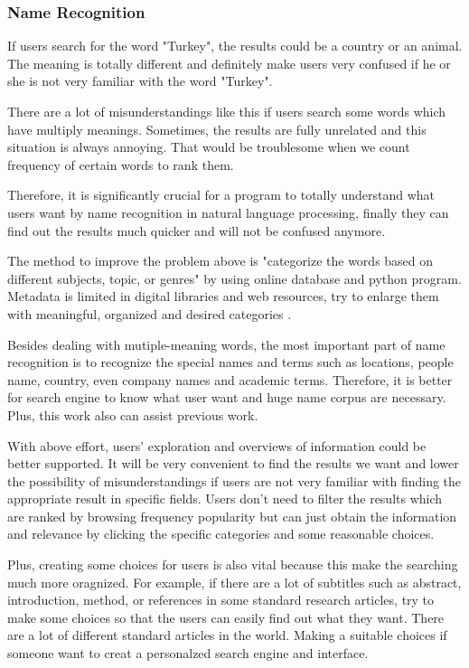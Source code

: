 \subsubsection*{Name Recognition}

If users search for the word "Turkey", the results could be a country or an animal. 
The meaning is totally different and definitely make users very confused if he or she is not very familiar with the word "Turkey". 

There are a lot of misunderstandings like this if users search some words which have multiply meanings. 
Sometimes, the results are fully unrelated and this situation is always annoying. 
That would be troublesome when we count frequency of certain words to rank them.

Therefore, it is significantly crucial for a program to totally understand what users want by name recognition in natural language processing, finally they can find out the results much quicker and will not be confused anymore.

The method to improve the problem above is "categorize the words based on different subjects, topic, or genres" by using online database and python program. 
Metadata is limited in digital libraries and web resources, try to enlarge them with meaningful, organized and desired categories \cite{Kules2006}.

Besides dealing with mutiple-meaning words, the most important part of name recognition is to recognize the special names and terms such as locations, people name, country, even company names and academic terms.
Therefore, it is better for search engine to know what user want and huge name corpus are necessary. 
Plus, this work also can assist previous work.

With above effort, users' exploration and overviews of information could be better supported. It will be very convenient to find the results we want and lower the possibility of misunderstandings if users are not very familiar with finding the appropriate result in specific fields.
\cite{TunThuraThet2010} Users don't need to filter the results which are ranked by browsing frequency popularity but can just obtain the information and relevance by clicking the specific categories and some reasonable choices.

Plus, creating some choices for users is also vital because this make the searching much more oragnized. 
For example, if there are a lot of subtitles such as abstract, introduction, method, or references in some standard research articles, try to make some choices so that the users can easily find out what they want. 
There are a lot of different standard articles in the world.
 Making a suitable choices if someone want to creat a personalzed search engine and interface. 

